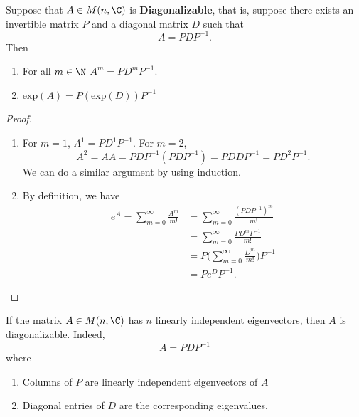 \begin{prop}
   Suppose that \( A \in M(n,\C)  \) is \textbf{Diagonalizable}, that is, suppose there exists an invertible matrix \( P  \) and a diagonal matrix \( D \) such that  
   \[  A = P D P^{-1}. \]
   Then 
   \begin{enumerate}
       \item[(i)] For all \( m \in \N  \) \( A^{m} = P D^{m} P^{-1} \).
        \item[(ii)] \( \text{exp}(A) = P (\text{exp}(D)) P^{-1} \) 
   \end{enumerate}
\end{prop}
\begin{proof}
\begin{enumerate}
    \item[(i)] For \(  m = 1  \), \( A^{1} = P D^{1} P^{-1}  \). For \( m = 2  \), \[ A^{2} = AA = P D P^{-1} (P D P^{-1})  = P D D P^{-1} = P D^{2} P^{-1}. \] We can do a similar argument by using induction.
        \item[(ii)] By definition, we have
            \begin{align*}
                e^{A} = \sum_{  m = 0  }^{ \infty  } \frac{ A^{m} }{ m!  }  &= \sum_{ m = 0  }^{ \infty   } \frac{ (P D P^{-1})^{m} }{ m !   }  \\
                      &= \sum_{ m = 0  }^{ \infty   } \frac{ P D^{m} P^{-1} }{ m!  }  \\
                      &= P \Big(  \sum_{ m = 0  }^{ \infty  } \frac{ D^{m} }{ m! }  \Big) P^{-1}  \\ 
                      &= P e^{D} P^{-1}.
            \end{align*}
\end{enumerate}
\end{proof}

\begin{remark}
   If the matrix \( A \in M(n,\C) \) has \( n  \) linearly independent eigenvectors, then \( A  \) is diagonalizable. Indeed, 
   \[  A = P D P^{-1} \]
   where 
   \begin{enumerate}
       \item[(*)] Columns of \( P \) are linearly independent eigenvectors of \( A  \)
        \item[(*)] Diagonal entries of \( D  \) are the corresponding eigenvalues.
   \end{enumerate}
\end{remark}

